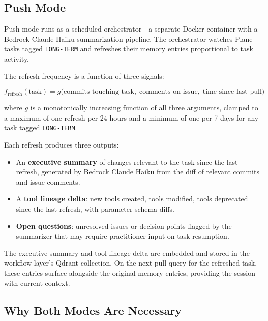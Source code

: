 \documentclass[11pt]{article}
\begin{document}
\subsection{Push Mode}
\label{sec:push-mode}

Push mode runs as a scheduled orchestrator---a separate Docker container with a Bedrock Claude Haiku summarization pipeline.
The orchestrator watches Plane tasks tagged \texttt{LONG-TERM} and refreshes their memory entries proportional to task activity.

The refresh frequency is a function of three signals:

\begin{equation}
  f_{\text{refresh}}(\text{task}) = g\bigl(
    \text{commits-touching-task},\;
    \text{comments-on-issue},\;
    \text{time-since-last-pull}
  \bigr)
  \label{eq:refresh}
\end{equation}

\noindent where $g$ is a monotonically increasing function of all three arguments, clamped to a maximum of one refresh per 24 hours and a minimum of one per 7 days for any task tagged \texttt{LONG-TERM}.

Each refresh produces three outputs:
\begin{itemize}[leftmargin=*, nosep]
  \item An \textbf{executive summary} of changes relevant to the task since the last refresh, generated by Bedrock Claude Haiku from the diff of relevant commits and issue comments.
  \item A \textbf{tool lineage delta}: new tools created, tools modified, tools deprecated since the last refresh, with parameter-schema diffs.
  \item \textbf{Open questions}: unresolved issues or decision points flagged by the summarizer that may require practitioner input on task resumption.
\end{itemize}

The executive summary and tool lineage delta are embedded and stored in the workflow layer's Qdrant collection.
On the next pull query for the refreshed task, these entries surface alongside the original memory entries, providing the session with current context.

\subsection{Why Both Modes Are Necessary}
\label{sec:why-both}
\end{document}
